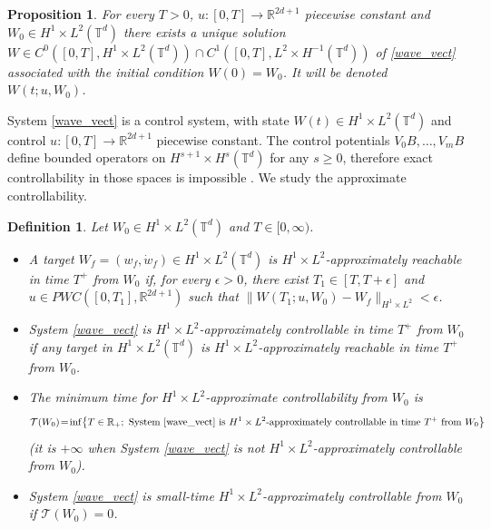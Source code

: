 \documentclass[a4paper]{article}
\theoremstyle{plain}
\newtheorem{proposition}[theorem]{Proposition}
\newtheorem{definition}[theorem]{Definition}
\newcommand{\T}{\mathbb{T}}
\newcommand{\R}{\mathbb{R}}
\begin{document}
\begin{proposition} \label{Prop:WP}
For every $T>0$, $u:[0,T] \to \R^{2d+1}$ piecewise constant and $W_0 \in H^1 \times L^2(\T^d)$ there exists a unique solution 
$W \in C^0([0,T],H^1 \times L^2(\T^d)) \cap C^1([0,T],L^2 \times H^{-1}(\T^d))$ of \eqref{wave_vect} associated with the initial condition
$W(0)=W_0$. It will be denoted $W(t;u,W_0)$.   
\end{proposition}

System \eqref{wave_vect} is a control system, with state $W(t) \in H^1 \times L^2(\T^d)$ and control $u:[0,T] \to \R^{2d+1}$ piecewise constant. The control potentials $V_0B,\dots,V_mB$ define bounded operators on $H^{s+1}\times H^{s}(\T^d)$ for any $s\geq 0$, therefore exact controllability in those spaces is impossible \cite{BMS}. We study the approximate controllability.


\begin{definition}
Let $W_0 \in H^1 \times L^2(\T^d)$ and $T \in [0,\infty)$. 
\begin{itemize}[topsep=0cm, parsep=0cm, itemsep=0cm]
%
\item A target $W_f=(w_f,\dot{w}_f) \in H^1 \times L^2(\T^d)$ is $H^1 \times L^2$-approximately reachable in time $T^+$ from $W_0$ if, for every $\epsilon>0$, there exist $T_1 \in [T,T+\epsilon]$ and $u \in PWC([0,T_1],\R^{2d+1})$ such that $\|W(T_1;u,W_0)-W_f\|_{H^1 \times L^2}<\epsilon$.
%
\item System \eqref{wave_vect} is $H^1 \times L^2$-approximately controllable in time $T^+$ from $W_0$ if any target in $H^1 \times L^2(\T^d)$ is $H^1 \times L^2$-approximately reachable in time $T^+$ from $W_0$. 
% 
\item The minimum time for $H^1 \times L^2$-approximate controllability from $W_0$ is 
\begin{equation}\label{eq:equality-rays}
\mathcal{T}(W_0)\!=\!\inf\!\left\{ T\in \R_+ ; \text{ System } \eqref{wave_vect} \text{ is } H^1 \times L^2 \text{-approximately controllable in time } T^+ \text{ from } W_0 \right\}
\end{equation}
(it is $+\infty$ when System \eqref{wave_vect} is not $H^1 \times L^2$-approximately controllable from $W_0$).
%
\item System \eqref{wave_vect} is small-time $H^1 \times L^2$-approximately controllable from $W_0$ if $\mathcal{T}(W_0)=0$.
\end{itemize}
\end{definition}
\end{document}
